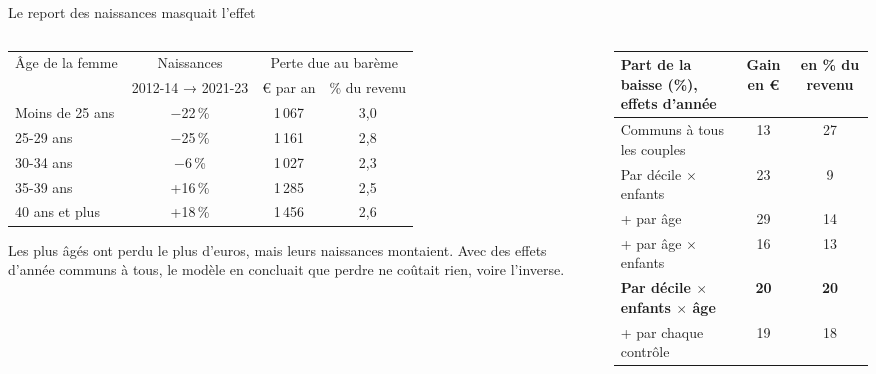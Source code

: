 \documentclass[10pt,aspectratio=169]{beamer}
\begin{document}
\begin{frame}{Le report des naissances masquait l'effet}
  \begin{columns}[T]
    \begin{column}{0.49\textwidth}
      \scriptsize\setlength{\tabcolsep}{3pt}
      \begin{tabular}{@{}lccc@{}}
        \toprule
        Âge de la femme & Naissances & \multicolumn{2}{c}{Perte due au barème} \\
        & 2012-14 → 2021-23 & € par an & \% du revenu \\
        \midrule
        Moins de 25 ans & $-$22\,\% & 1\,067 & 3,0 \\
        25-29 ans & $-$25\,\% & 1\,161 & 2,8 \\
        30-34 ans & $-$6\,\% & 1\,027 & 2,3 \\
        35-39 ans & +16\,\% & 1\,285 & 2,5 \\
        40 ans et plus & +18\,\% & 1\,456 & 2,6 \\
        \bottomrule
      \end{tabular}
      \vspace{0.25cm}

      \footnotesize\RaggedRight Les plus âgés ont perdu le plus d'euros, mais leurs naissances montaient. Avec des effets d'année communs à tous, le modèle en concluait que perdre ne coûtait rien, voire l'inverse.
    \end{column}
    \begin{column}{0.47\textwidth}
      \scriptsize\setlength{\tabcolsep}{3pt}
      \begin{tabular}{@{}lcc@{}}
        \toprule
        Part de la baisse (\%), effets d'année & Gain en € & en \% du revenu \\
        \midrule
        Communs à tous les couples & 13 & 27 \\
        Par décile $\times$ enfants & 23 & 9 \\
        \quad + par âge & 29 & 14 \\
        \quad + par âge $\times$ enfants & 16 & 13 \\
        \textbf{Par décile $\times$ enfants $\times$ âge} & \textbf{20} & \textbf{20} \\
        \quad + par chaque contrôle & 19 & 18 \\
        \bottomrule
      \end{tabular}
      \vspace{0.2cm}


\end{column}
\end{columns}
\end{frame}
\end{document}
